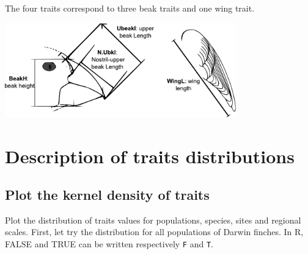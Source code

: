 \documentclass[12pt]{article}\usepackage[]{graphicx}\usepackage[]{color}
\begin{document}
The four traits correspond to three beak traits and one wing trait.

\begin{center}
\includegraphics[width = 10cm]{figs/darwinfinch.pdf}
\end{center}

\newpage


\section{Description of traits distributions}

\subsection{Plot the kernel density of traits}

Plot the distribution of traits values for populations, species, sites and regional scales. First, let try the distribution for all populations of Darwin finches. In R, FALSE and TRUE can be written respectively \texttt{F} and \texttt{T}.
\end{document}
